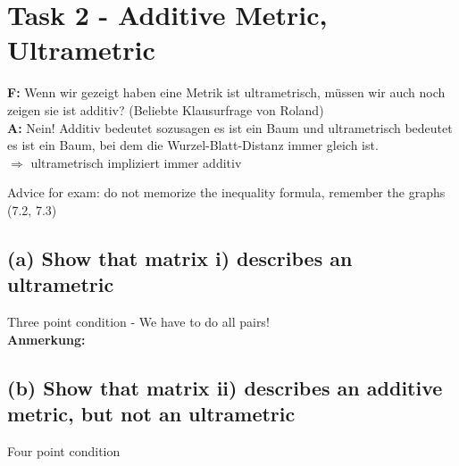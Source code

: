 \section{Task 2 - Additive Metric, Ultrametric}
\begin{mechanism}[title=Frage]
\textbf{F:} Wenn wir gezeigt haben eine Metrik ist ultrametrisch, müssen wir auch noch zeigen sie ist additiv? (Beliebte Klausurfrage von Roland) \\
\textbf{A:} Nein! Additiv bedeutet sozusagen es ist ein Baum und ultrametrisch bedeutet es ist ein Baum, bei dem die Wurzel-Blatt-Distanz immer gleich ist.  \\
$\Rightarrow$ ultrametrisch impliziert immer additiv
\end{mechanism}
Advice for exam: do not memorize the inequality formula, remember the graphs (7.2, 7.3)
\subsection{(a) Show that matrix i) describes an ultrametric}
Three point condition - We have to do all pairs! \\
\textbf{Anmerkung:} 
\begin{center}
\end{center}


\subsection{(b) Show that matrix ii) describes an additive metric, but not an ultrametric}
Four point condition 


